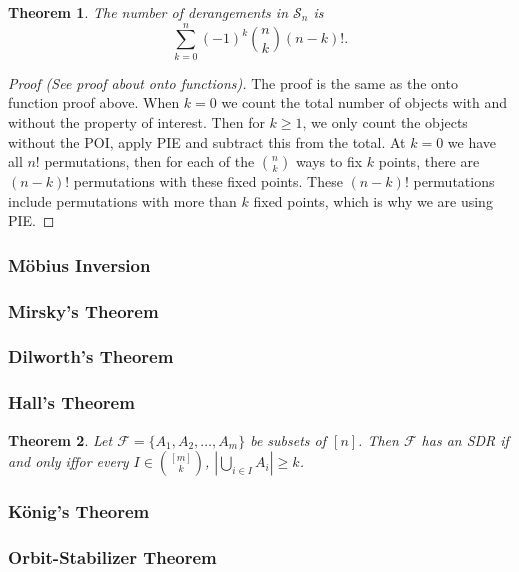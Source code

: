 \documentclass[12]{article}
\newtheorem{thm}{Theorem}[section] %
\theoremstyle{definition}
\begin{document}
	\begin{thm}
		The number of derangements in $\mathcal{S}_n$ is
		$$\sum_{k=0}^n (-1)^k {n \choose k}(n-k)!.$$
	\end{thm}

	\begin{proof}[Proof (See proof about onto functions)]
		The proof is the same as the onto function proof above.  When $k=0$ we count the total number of objects with and without the property of interest.  Then for $k \geq 1$, we only count the objects without the POI, apply PIE and subtract this from the total.  At $k=0$ we have all $n!$ permutations, then for each of the ${n \choose k}$ ways to fix $k$ points, there are $(n-k)!$ permutations with these fixed points.  These $(n-k)!$ permutations include permutations with more than $k$ fixed points, which is why we are using PIE.
	\end{proof}
	
	\subsubsection{M\"obius Inversion}
	
	\subsubsection{Mirsky's Theorem}
	
	\subsubsection{Dilworth's Theorem}
	
	\subsubsection{Hall's Theorem}
	
	\begin{thm}
		Let $\mathcal{F} = \{A_1, A_2, \ldots, A_m\}$ be subsets of $[n]$.  Then $\mathcal{F}$ has an SDR if and only iffor every $I \in {[m] \choose k}$, $|\bigcup_{i \in I}A_i| \geq k$.
	\end{thm}
	
	\subsubsection{K\"onig's Theorem}
	
	\subsubsection{Orbit-Stabilizer Theorem}
	
\end{document}

